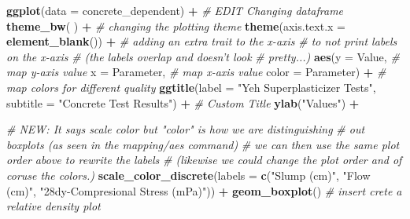 \documentclass[]{article}
\newenvironment{Shaded}{\begin{snugshade}}{\end{snugshade}}
\newcommand{\CommentTok}[1]{\textcolor[rgb]{0.56,0.35,0.01}{\textit{#1}}}
\newcommand{\DataTypeTok}[1]{\textcolor[rgb]{0.13,0.29,0.53}{#1}}
\newcommand{\KeywordTok}[1]{\textcolor[rgb]{0.13,0.29,0.53}{\textbf{#1}}}
\newcommand{\NormalTok}[1]{#1}
\newcommand{\OperatorTok}[1]{\textcolor[rgb]{0.81,0.36,0.00}{\textbf{#1}}}
\newcommand{\StringTok}[1]{\textcolor[rgb]{0.31,0.60,0.02}{#1}}
\begin{document}
\begin{Shaded}
\begin{Highlighting}[]
\KeywordTok{ggplot}\NormalTok{(}\DataTypeTok{data =}\NormalTok{ concrete_dependent) }\OperatorTok{+}\StringTok{      }\CommentTok{# EDIT Changing dataframe}
\StringTok{  }
\StringTok{  }\KeywordTok{theme_bw}\NormalTok{( ) }\OperatorTok{+}\StringTok{                            }\CommentTok{# changing the plotting theme}
\StringTok{  }
\StringTok{  }\KeywordTok{theme}\NormalTok{(}\DataTypeTok{axis.text.x =} \KeywordTok{element_blank}\NormalTok{()) }\OperatorTok{+}\StringTok{   }\CommentTok{# adding an extra trait to the x-axis}
\StringTok{                                           }\CommentTok{# to not print labels on the x-axis }
\StringTok{                                           }\CommentTok{# (the labels overlap and doesn't look}
\StringTok{                                           }\CommentTok{# pretty...)}
\StringTok{  }
\StringTok{  }\KeywordTok{aes}\NormalTok{(}\DataTypeTok{y      =}\NormalTok{ Value,                     }\CommentTok{# map y-axis value}
      \DataTypeTok{x      =}\NormalTok{ Parameter,                 }\CommentTok{# map x-axis value}
      \DataTypeTok{color  =}\NormalTok{ Parameter) }\OperatorTok{+}\StringTok{               }\CommentTok{# map colors for different quality}
\StringTok{  }
\StringTok{  }\KeywordTok{ggtitle}\NormalTok{(}\DataTypeTok{label    =} \StringTok{"Yeh Superplasticizer Tests"}\NormalTok{,}
          \DataTypeTok{subtitle =} \StringTok{"Concrete Test Results"}\NormalTok{) }\OperatorTok{+}\StringTok{ }\CommentTok{# Custom Title}
\StringTok{  }
\StringTok{  }\KeywordTok{ylab}\NormalTok{(}\StringTok{"Values"}\NormalTok{) }\OperatorTok{+}

\StringTok{  }\CommentTok{# NEW: It says scale color but "color" is how we are distinguishing}
\StringTok{  }\CommentTok{#      out boxplots (as seen in the mapping/aes command)}
\StringTok{  }\CommentTok{#      we can then use the same plot order above to rewrite the labels}
\StringTok{  }\CommentTok{#      (likewise we could change the plot order and of coruse the colors.)}
\StringTok{  }\KeywordTok{scale_color_discrete}\NormalTok{(}\DataTypeTok{labels =} \KeywordTok{c}\NormalTok{(}\StringTok{"Slump (cm)"}\NormalTok{,}
                                  \StringTok{"Flow (cm)"}\NormalTok{, }
                                  \StringTok{"28dy-Compresional Stress (mPa)"}\NormalTok{)) }\OperatorTok{+}\StringTok{ }
\StringTok{  }
\StringTok{  }\KeywordTok{geom_boxplot}\NormalTok{() }\CommentTok{# insert crete a relative density plot }
\end{Highlighting}
\end{Shaded}
\end{document}
